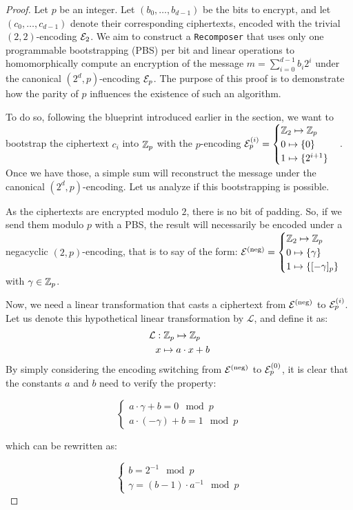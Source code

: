 \begin{proof}
Let $p$ be an integer. Let $(b_0, \dots, b_{d-1})$ be the bits to encrypt, and let $(c_0, \dots, c_{d - 1})$ denote their corresponding ciphertexts, encoded with the trivial $(2, 2)$-encoding $\mathcal{E}_2$. We aim to construct a \texttt{Recomposer} that uses only one programmable bootstrapping (PBS) per bit and linear operations to homomorphically compute an encryption of the message $m = \sum_{i=0}^{d-1} b_i 2^i$ under the canonical $(2^d, p)$-encoding $\mathcal{E}_p$. The purpose of this proof is to demonstrate how the parity of $p$ influences the existence of such an algorithm.

To do so, following the blueprint introduced earlier in the section, we want to bootstrap the ciphertext $c_i$ into $\mathbb{Z}_p$ with the $p$-encoding $\mathcal{E}_p^{(i)} = \begin{cases} \mathbb{Z}_2 \mapsto \mathbb{Z}_{p} \\ 0 \mapsto \{0\} \\ 1 \mapsto \{2^{i+1}\} \end{cases}$. Once we have those, a simple sum will reconstruct the message under the canonical $(2^d, p)$-encoding. Let us analyze if this bootstrapping is possible.

As the ciphertexts are encrypted modulo $2$, there is no bit of padding. So, if we send them modulo $p$ with a PBS, the result will necessarily be encoded under a negacyclic $(2, p)$-encoding, that is to say of the form: $\mathcal{E}^{\text{(neg)}} = \begin{cases} \mathbb{Z}_2 \mapsto \mathbb{Z}_{p} \\ 0 \mapsto \{\gamma\} \\ 1 \mapsto \{[-\gamma]_p\} \end{cases}$ with $\gamma \in \mathbb{Z}_p$.

Now, we need a linear transformation that casts a ciphertext from $\mathcal{E}^{\text{(neg)}}$ to $\mathcal{E}_p^{(i)}$. Let us denote this hypothetical linear transformation by $\mathcal{L}$, and define it as: \begin{align*}
    \mathcal{L} &: \mathbb{Z}_p \mapsto \mathbb{Z}_p\\
    & x \mapsto a \cdot x + b
\end{align*} 
By simply considering the encoding switching from $\mathcal{E}^{\text{(neg)}}$ to $\mathcal{E}_p^{(0)}$, it is clear that the constants $a$ and $b$ need to verify the property:

\[
    \begin{cases}
        a \cdot \gamma + b = 0 \mod p\\
        a \cdot (- \gamma) + b = 1 \mod p 
    \end{cases}
\]

which can be rewritten as:

\[
    \begin{cases}
        b = 2^{-1} \mod p\\
        \gamma = (b - 1) \cdot a^{-1} \mod p
    \end{cases}
\]



\end{proof}
